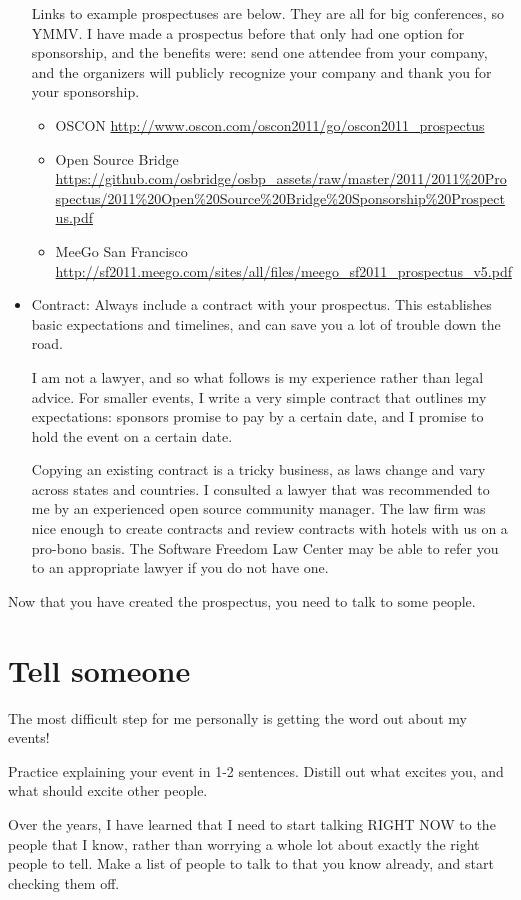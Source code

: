 \begin{itemize}
Links to example prospectuses are below. They are all for big conferences, so
YMMV. I have made a prospectus before that
only had one option for sponsorship, and the benefits were: send one attendee
from your company, and the organizers will publicly recognize your company and 
thank you for your sponsorship.
\begin{itemize}
\item OSCON \url{http://www.oscon.com/oscon2011/go/oscon2011_prospectus}
\item Open Source Bridge
\url{https://github.com/osbridge/osbp_assets/raw/master/2011/2011\%20Prospectus/2011\%20Open\%20Source\%20Bridge\%20Sponsorship\%20Prospectus.pdf}
\item MeeGo San Francisco
\url{http://sf2011.meego.com/sites/all/files/meego_sf2011_prospectus_v5.pdf}
\end{itemize}

\item Contract:
Always include a contract with your prospectus. This establishes basic
expectations and timelines, and can save you a lot of trouble down the road.

I am not a lawyer, and so what follows is my experience rather than legal
advice. For smaller events, I write a very simple contract that outlines my
expectations: sponsors promise to pay by a certain date, and I promise to hold
the event on a certain date.

Copying an existing contract is a tricky business, as laws change and vary
across states and countries. I consulted a lawyer that was recommended to me by
an experienced open source community manager. The law firm was nice enough to
create contracts and review contracts with hotels with us on a pro-bono basis.
The Software Freedom Law Center may be able to refer you to an appropriate
lawyer if you do not have one.
\end{itemize}

Now that you have created the prospectus, you need to talk to some people.

\section*{Tell someone}
The most difficult step for me personally is getting the word out about my
events! 

Practice explaining your event in 1-2 sentences. Distill out what excites you,
and what should excite other people.

Over the years, I have learned that I need to start talking RIGHT NOW to the
people that I know, rather than worrying a whole lot about exactly the right
people to tell.  Make a list of people to talk to that you know already, and
start checking them off.

